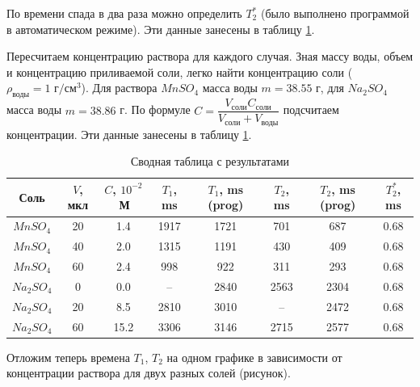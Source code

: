По времени спада в два раза можно определить $ T_2^* $ (было выполнено программой в автоматическом режиме). Эти данные занесены в таблицу \ref{table:all-T}.

Пересчитаем концентрацию раствора для каждого случая. Зная массу воды, объем и концентрацию приливаемой соли, легко найти концентрацию соли ($ \rho_\text{воды} = 1 \text{ г}/\text{см}^3 $). Для раствора $ Mn SO_4 $ масса воды $ m = 38.55 $ г, для $ Na_2 SO_4 $ масса воды $ m = 38.86 $ г. По формуле $ C = \dfrac{V_\text{соли} C_\text{соли}}{V_\text{соли} + V_\text{воды}} $ подсчитаем концентрации. Эти данные занесены в таблицу \ref{table:all-T}.

\begin{table}[ht]
	\caption{Сводная таблица с результатами}
	\label{table:all-T}
	\centering
	\begin{tabular}{|c|c|c|c|c|c|c|c|}
		\toprule
		Соль &  $V$, мкл & $C$, $10^{-2}$\,М & $T_1$, ms & $T_1$, ms (prog) & $T_2$, ms & $T_2$, ms (prog) & $T_2^*$, ms \\
		\midrule
		$MnSO_4$  	&  20 &  1.4 &  1917 & 1721 &   701 & 687  &  0.68 \\
		$MnSO_4$  	&  40 &  2.0 &  1315 & 1191 &   430 & 409  &  0.68 \\
		$MnSO_4$ 	&  60 &  2.4 &   998 & 922  &   311 & 293  &  0.68 \\
		$Na_2 SO_4$ &   0 &  0.0 &   --  & 2840 &  2563 & 2304 &  0.68 \\
		$Na_2 SO_4$ &  20 &  8.5 &  2810 & 3010 &   --  & 2472 &  0.68 \\
		$Na_2 SO_4$ &  60 & 15.2 &  3306 & 3146 &  2715 & 2577 &  0.68 \\
		\bottomrule
	\end{tabular}
\end{table}


Отложим теперь времена $ T_1 $, $ T_2 $ на одном графике в зависимости от концентрации раствора для двух разных солей (рисунок).
